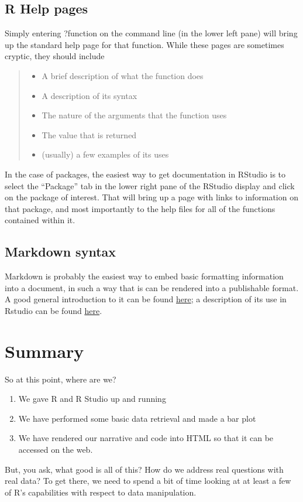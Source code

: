 \documentclass[]{tufte-book}
\providecommand{\tightlist}{%
  \setlength{\itemsep}{0pt}\setlength{\parskip}{0pt}}
\begin{document}
\section{R Help pages}\label{r-help-pages}

Simply entering ?function on the command line (in the lower left pane)
will bring up the standard help page for that function. While these
pages are sometimes cryptic, they should include

\begin{quote}
\begin{itemize}
\tightlist
\item
  A brief description of what the function does
\item
  A description of its syntax
\item
  The nature of the arguments that the function uses
\item
  The value that is returned
\item
  (usually) a few examples of its uses
\end{itemize}
\end{quote}

In the case of packages, the easiest way to get documentation in RStudio
is to select the ``Package'' tab in the lower right pane of the RStudio
display and click on the package of interest. That will bring up a page
with links to information on that package, and most importantly to the
help files for all of the functions contained within it.

\section{Markdown syntax}\label{markdown-syntax}

Markdown is probably the easiest way to embed basic formatting
information into a document, in such a way that is can be rendered into
a publishable format. A good general introduction to it can be found
\href{http://net.tutsplus.com/tutorials/tools-and-tips/markdown-the-ins-and-outs/}{here};
a description of its use in Rstudio can be found
\href{http://www.rstudio.com/ide/docs/authoring/using_markdown}{here}.

\chapter{Summary}\label{summary}

So at this point, where are we?

\begin{enumerate}
\def\labelenumi{\arabic{enumi}.}
\tightlist
\item
  We gave R and R Studio up and running
\item
  We have performed some basic data retrieval and made a bar plot
\item
  We have rendered our narrative and code into HTML so that it can be
  accessed on the web.
\end{enumerate}

But, you ask, what good is all of this? How do we address real questions
with real data? To get there, we need to spend a bit of time looking at
at least a few of R's capabilities with respect to data manipulation.

\renewcommand\bibname{References}

\end{document}
